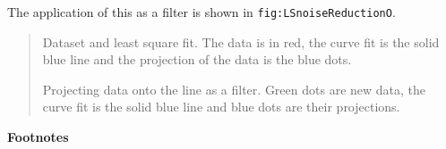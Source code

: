 The application of this as a filter is shown in
\texttt{fig:LSnoiseReductionO}.

\begin{quote}
Dataset and least square fit. The data is in red, the curve fit is the
solid blue line and the projection of the data is the blue dots.

Projecting data onto the line as a filter. Green dots are new data, the
curve fit is the solid blue line and blue dots are their projections.
\end{quote}

\textbf{Footnotes}
